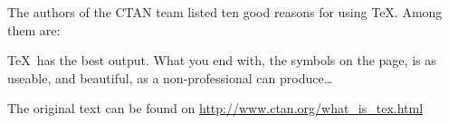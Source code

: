 \documentclass{article}
\begin{document}
The authors of the CTAN team listed ten good reasons for using \TeX. Among them are:

\TeX\ has the best output. What you end with, the symbols on the page, is as useable, and beautiful, as a non-professional can produce\ldots

The original text can be found on \url{http://www.ctan.org/what_is_tex.html}
\end{document}
